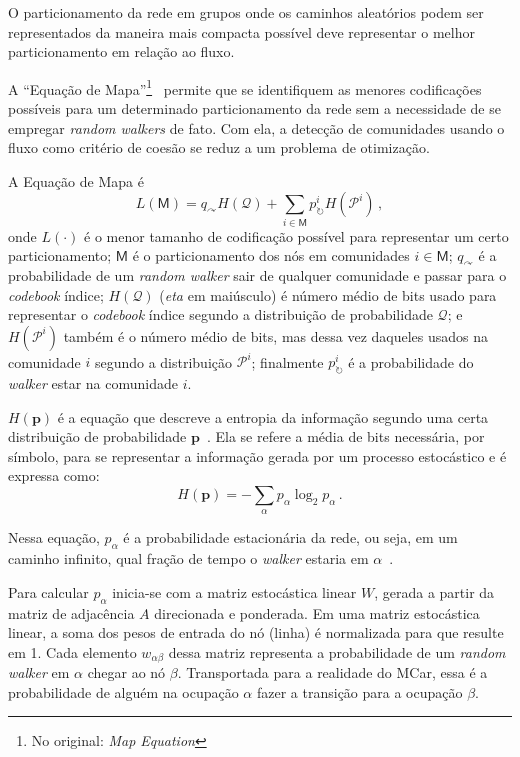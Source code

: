 \documentclass[
  article,
  11pt,
  a4paper,
  english,
  brazil,
  sumario=tradicional]{abntex2}
\begin{document}
O particionamento da rede em grupos onde os caminhos aleatórios podem ser representados da maneira mais compacta possível deve representar o melhor particionamento em relação ao fluxo.

A \enquote{Equação de Mapa}\footnote{No original: \textit{Map Equation}}~\cite{Rosvall2009-sd} permite que se identifiquem as menores codificações possíveis para um determinado particionamento da rede sem a necessidade de se empregar \textit{random walkers} de fato. Com ela, a detecção de comunidades usando o fluxo como critério de coesão se reduz a um problema de otimização.

A Equação de Mapa é
\begin{equation} \label{eq:map-equation}
  L(\mathsf{M}) = q_\curvearrowright H(\mathcal{Q}) + \sum_{i \in \mathsf{M}} p^i_\circlearrowright H(\mathcal{P}^i)\,,
\end{equation}
onde $L(\cdot)$ é o menor tamanho de codificação possível para representar um certo particionamento; $\mathsf{M}$ é o particionamento dos nós em comunidades $i \in \mathsf{M}$; $q_\curvearrowright$ é a probabilidade de um \textit{random walker} sair de qualquer comunidade e passar para o \textit{codebook} índice; $H(\mathcal{Q})$ (\textit{eta} em maiúsculo) é número médio de bits usado para representar o \textit{codebook} índice segundo a distribuição de probabilidade $\mathcal{Q}$; e $H(\mathcal{P}^i)$ também é o número médio de bits, mas dessa vez daqueles usados na comunidade $i$ segundo a distribuição $\mathcal{P}^i$; finalmente $p^i_\circlearrowright$ é a probabilidade do \textit{walker} estar na comunidade $i$.

$H(\textbf{p})$ é a equação que descreve a entropia da informação segundo uma certa distribuição de probabilidade $\textbf{p}$~\cite{Shannon1948-ic}. Ela se refere a média de bits necessária, por símbolo, para se representar a informação gerada por um processo estocástico e é expressa como:
\begin{equation*}
H(\textbf{p}) = - \sum_\alpha p_\alpha \log_2 p_\alpha\,.
\end{equation*}

Nessa equação, $p_\alpha$ é a probabilidade estacionária da rede, ou seja, em um caminho infinito, qual fração de tempo o \textit{walker} estaria em $\alpha$~\cite{Rosvall2009-sd}.

Para calcular $p_\alpha$ inicia-se com a matriz estocástica linear $W$, gerada a partir da matriz de adjacência $A$ direcionada e ponderada. Em uma matriz estocástica linear, a soma dos pesos de entrada do nó (linha) é normalizada para que resulte em 1. Cada elemento $w_{\alpha \beta}$ dessa matriz representa a probabilidade de um \textit{random walker}  em $\alpha$ chegar ao nó $\beta$.  Transportada para a realidade do MCar, essa é a probabilidade de alguém na ocupação $\alpha$ fazer a transição para a ocupação $\beta$.
\end{document}

